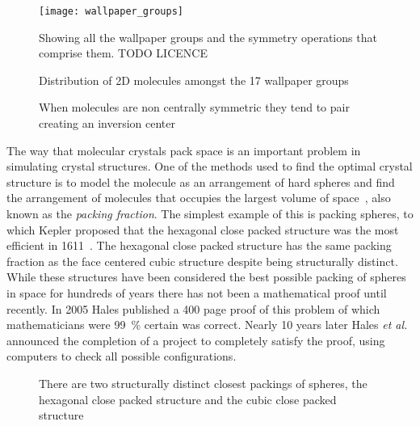 \begin{figure}
    \texttt{[image: wallpaper\_groups]}
    \caption{Showing all the wallpaper groups and the symmetry operations that comprise them. TODO LICENCE}
    \label{fig:wallpaper}
\end{figure}

\begin{figure}
    \caption{Distribution of 2D molecules amongst the 17 wallpaper groups}
    \label{fig:wallpaper dist}
\end{figure}

\begin{figure}
    \caption{When molecules are non centrally symmetric they tend to pair creating an inversion center}
    \label{fig:molecule pair}
\end{figure}

The way that molecular crystals pack space is an important problem in simulating crystal structures. One of the methods used to find the optimal crystal structure is to model the molecule as an arrangement of hard spheres and find the arrangement of molecules that occupies the largest volume of space~\cite{kitaigorodskii:73}, also known as the \emph{packing fraction}. The simplest example of this is packing spheres, to which Kepler proposed that the hexagonal close packed structure was the most efficient in 1611~\cite{kepler:1611}. The hexagonal close packed structure has the same packing fraction as the face centered cubic structure despite being structurally distinct. While these structures have been considered the best possible packing of spheres in space for hundreds of years there has not been a mathematical proof until recently. In 2005 Hales\cite{hales:05} published a 400 page proof of this problem of which mathematicians were \SI{99}{\percent} certain was correct. Nearly 10 years later Hales {\em et al.}~\cite{hales:14} announced the completion of a project to completely satisfy the proof, using computers to check all possible configurations. 

\begin{figure}
    \caption{There are two structurally distinct closest packings of spheres, the hexagonal close packed structure and the cubic close packed structure}
    \label{fig:sphere packing}
\end{figure}

